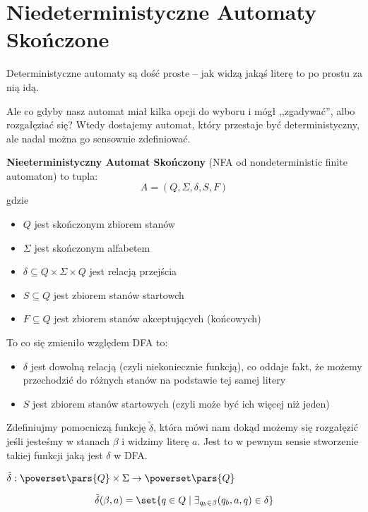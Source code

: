 \section{Niedeterministyczne Automaty Skończone}
Deterministyczne automaty są dość proste -- jak widzą jakąś literę to po prostu za nią idą.

Ale co gdyby nasz automat miał kilka opcji do wyboru i mógł ,,zgadywać'', albo rozgałęziać się? Wtedy dostajemy automat, który przestaje być deterministyczny, ale nadal można go sensownie zdefiniować.

\begin{definition}
    \textbf{Nieeterministyczny Automat Skończony} (NFA od nondeterministic finite automaton) to tupla:
    \[
        A = (Q, \Sigma, \delta, S, F)
    \]
    gdzie
    \begin{itemize}
        \item \( Q \) jest skończonym zbiorem stanów
        \item \( \Sigma \) jest skończonym alfabetem
        \item \( \delta \subseteq Q \times \Sigma \times Q \) jest relacją przejścia
        \item \( S \subseteq Q \) jest zbiorem stanów startowch
        \item \( F \subseteq Q \) jest zbiorem stanów akceptujących (końcowych)
    \end{itemize}
\end{definition}

To co się zmieniło względem DFA to:
\begin{itemize}
    \item \( \delta \) jest dowolną relacją (czyli niekoniecznie funkcją), co oddaje fakt, że możemy przechodzić do różnych stanów na podstawie tej samej litery
    \item \( S \) jest zbiorem stanów startowych (czyli może być ich więcej niż jeden)
\end{itemize}

Zdefiniujmy pomocniczą funkcję \( \tilde \delta \), która mówi nam dokąd możemy się rozgałęzić jeśli jesteśmy w stanach \( \beta \) i widzimy literę \( a \). Jest to w pewnym sensie stworzenie takiej funkcji jaką jest \( \delta \) w DFA.

\begin{definition}
    \( \tilde \delta : \powerset\pars{Q} \times \Sigma \rightarrow \powerset\pars{Q} \)
    
    \[
        \tilde \delta(\beta, a) 
            = \set{q \in Q \mid \exists_{q_b \in \beta} (q_b, a, q) \in \delta}
    \]
\end{definition}

